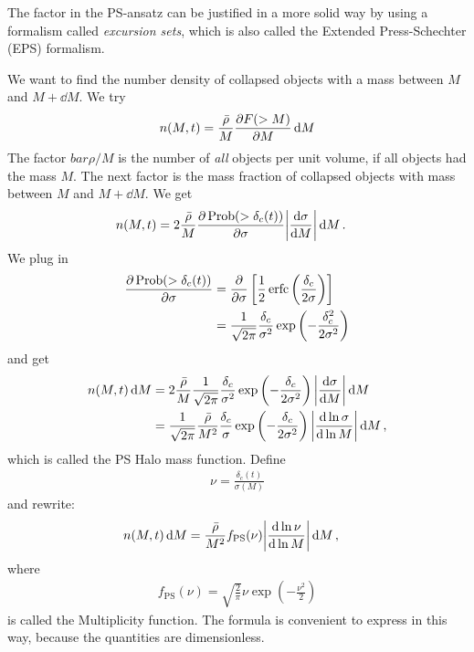 The factor in the PS-ansatz can be justified in a more solid way by using a formalism called \emph{excursion sets}, which is also called the Extended Press-Schechter (EPS) formalism.

We want to find the number density of collapsed objects with a mass between $M$ and $M + \dd{M}$.
We try
\begin{align*}
	n(M, t)
	= \frac{\bar{\rho}}{M}
	\pdv{F(>M)}{M} \dd{M}
\end{align*}
The factor $bar{\rho}/M$ is the number of \emph{all} objects per unit volume, if all objects had the mass $M$.
The next factor is the mass fraction of collapsed objects with mass between $M$ and $M+ \dd{M}$.
We get
\begin{align*}
	n(M, t)
	&= 2 \frac{\bar{\rho}}{M}
	\pdv{\Prob(>\delta_c(t))}{\sigma}
	\abs*{ \dv{\sigma}{M} }
	\dd{M}.
\end{align*}
We plug in
\begin{align*}
	\pdv{\Prob(>\delta_c(t))}{\sigma}
	&=
	\pdv{}{\sigma} \left[ 
		\frac{1}{2} \erfc \left( \frac{\delta_c}{2\sigma} \right)
	 \right]\\
	&= \frac{1}{\sqrt{2\pi}}
	\frac{\delta_c}{\sigma^2}
	\exp\left( - \frac{\delta_c^2}{2 \sigma^2} \right)
\end{align*}
and get
\begin{align*}
	n(M, t) \dd{M}
	&= 2 \frac{\bar{\rho}}{M}
	\frac{1}{\sqrt{2\pi}}
	\frac{\delta_c}{\sigma^2}
	\exp\left( -\frac{\delta_c}{2\sigma^2} \right)
	\abs*{\dv{\sigma}{M}} \dd{M}\\
	&= \frac{1}{\sqrt{2\pi}}
	\frac{\bar{\rho}}{M^2}
	\frac{\delta_c}{\sigma}
	\exp\left( -\frac{\delta_c}{2\sigma^2} \right)
	\abs*{\dv{\ln \sigma}{\ln M}}
	\dd{M},
\end{align*}
which is called the PS Halo mass function.
Define
\begin{align*}
	\nu = \frac{\delta_c(t)}{\sigma(M)}
\end{align*}
and rewrite:
\begin{align*}
	n(M, t) \dd{M}
	&= \frac{\bar{\rho}}{M^2} f_\text{PS}(\nu)
	\abs*{ \dv{\ln \nu}{\ln M} } \dd{M},
\end{align*}
where
\begin{align*}
	f_\text{PS}(\nu)
	= \sqrt{\frac{2}{\pi}} \nu \exp\left( - \frac{\nu^2}{2} \right)
\end{align*}
is called the Multiplicity function.
The formula is convenient to express in this way, because the quantities are dimensionless.

